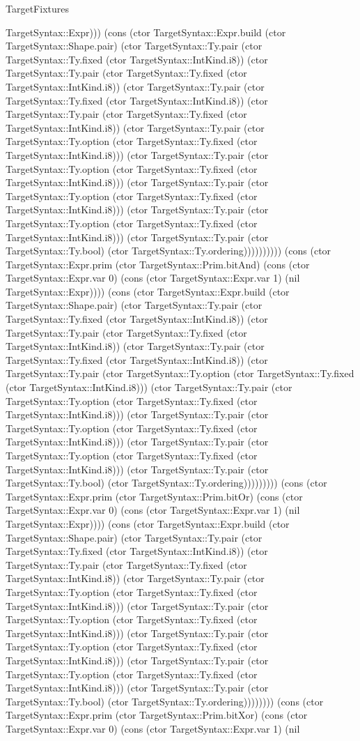 \begin{lexlean}{TargetFixtures}
\begin{semanticmodule}
{TargetSyntax::Expr))) (cons (ctor TargetSyntax::Expr.build (ctor TargetSyntax::Shape.pair) (ctor TargetSyntax::Ty.pair (ctor TargetSyntax::Ty.fixed (ctor TargetSyntax::IntKind.i8)) (ctor TargetSyntax::Ty.pair (ctor TargetSyntax::Ty.fixed (ctor TargetSyntax::IntKind.i8)) (ctor TargetSyntax::Ty.pair (ctor TargetSyntax::Ty.fixed (ctor TargetSyntax::IntKind.i8)) (ctor TargetSyntax::Ty.pair (ctor TargetSyntax::Ty.fixed (ctor TargetSyntax::IntKind.i8)) (ctor TargetSyntax::Ty.pair (ctor TargetSyntax::Ty.option (ctor TargetSyntax::Ty.fixed (ctor TargetSyntax::IntKind.i8))) (ctor TargetSyntax::Ty.pair (ctor TargetSyntax::Ty.option (ctor TargetSyntax::Ty.fixed (ctor TargetSyntax::IntKind.i8))) (ctor TargetSyntax::Ty.pair (ctor TargetSyntax::Ty.option (ctor TargetSyntax::Ty.fixed (ctor TargetSyntax::IntKind.i8))) (ctor TargetSyntax::Ty.pair (ctor TargetSyntax::Ty.option (ctor TargetSyntax::Ty.fixed (ctor TargetSyntax::IntKind.i8))) (ctor TargetSyntax::Ty.pair (ctor TargetSyntax::Ty.bool) (ctor TargetSyntax::Ty.ordering)))))))))) (cons (ctor TargetSyntax::Expr.prim (ctor TargetSyntax::Prim.bitAnd) (cons (ctor TargetSyntax::Expr.var 0) (cons (ctor TargetSyntax::Expr.var 1) (nil TargetSyntax::Expr)))) (cons (ctor TargetSyntax::Expr.build (ctor TargetSyntax::Shape.pair) (ctor TargetSyntax::Ty.pair (ctor TargetSyntax::Ty.fixed (ctor TargetSyntax::IntKind.i8)) (ctor TargetSyntax::Ty.pair (ctor TargetSyntax::Ty.fixed (ctor TargetSyntax::IntKind.i8)) (ctor TargetSyntax::Ty.pair (ctor TargetSyntax::Ty.fixed (ctor TargetSyntax::IntKind.i8)) (ctor TargetSyntax::Ty.pair (ctor TargetSyntax::Ty.option (ctor TargetSyntax::Ty.fixed (ctor TargetSyntax::IntKind.i8))) (ctor TargetSyntax::Ty.pair (ctor TargetSyntax::Ty.option (ctor TargetSyntax::Ty.fixed (ctor TargetSyntax::IntKind.i8))) (ctor TargetSyntax::Ty.pair (ctor TargetSyntax::Ty.option (ctor TargetSyntax::Ty.fixed (ctor TargetSyntax::IntKind.i8))) (ctor TargetSyntax::Ty.pair (ctor TargetSyntax::Ty.option (ctor TargetSyntax::Ty.fixed (ctor TargetSyntax::IntKind.i8))) (ctor TargetSyntax::Ty.pair (ctor TargetSyntax::Ty.bool) (ctor TargetSyntax::Ty.ordering))))))))) (cons (ctor TargetSyntax::Expr.prim (ctor TargetSyntax::Prim.bitOr) (cons (ctor TargetSyntax::Expr.var 0) (cons (ctor TargetSyntax::Expr.var 1) (nil TargetSyntax::Expr)))) (cons (ctor TargetSyntax::Expr.build (ctor TargetSyntax::Shape.pair) (ctor TargetSyntax::Ty.pair (ctor TargetSyntax::Ty.fixed (ctor TargetSyntax::IntKind.i8)) (ctor TargetSyntax::Ty.pair (ctor TargetSyntax::Ty.fixed (ctor TargetSyntax::IntKind.i8)) (ctor TargetSyntax::Ty.pair (ctor TargetSyntax::Ty.option (ctor TargetSyntax::Ty.fixed (ctor TargetSyntax::IntKind.i8))) (ctor TargetSyntax::Ty.pair (ctor TargetSyntax::Ty.option (ctor TargetSyntax::Ty.fixed (ctor TargetSyntax::IntKind.i8))) (ctor TargetSyntax::Ty.pair (ctor TargetSyntax::Ty.option (ctor TargetSyntax::Ty.fixed (ctor TargetSyntax::IntKind.i8))) (ctor TargetSyntax::Ty.pair (ctor TargetSyntax::Ty.option (ctor TargetSyntax::Ty.fixed (ctor TargetSyntax::IntKind.i8))) (ctor TargetSyntax::Ty.pair (ctor TargetSyntax::Ty.bool) (ctor TargetSyntax::Ty.ordering)))))))) (cons (ctor TargetSyntax::Expr.prim (ctor TargetSyntax::Prim.bitXor) (cons (ctor TargetSyntax::Expr.var 0) (cons (ctor TargetSyntax::Expr.var 1) (nil }
\end{semanticmodule}
\end{lexlean}
